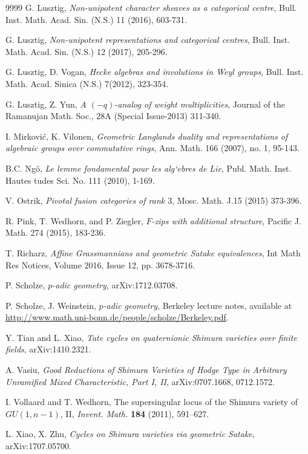\documentclass[11pt]{amsart}
\theoremstyle{definition}
\theoremstyle{definition}
\theoremstyle{definition}
\numberwithin{equation}{subsection}
\begin{document}
\begin{thebibliography}{9999}
G. Lusztig, {\it Non-unipotent character sheaves as a categorical centre}, Bull. Inst. Math. Acad. Sin. (N.S.) 11 (2016), 603-731.

G. Lusztig, {\it Non-unipotent representations and categorical centres}, Bull. Inst. Math. Acad. Sin. (N.S.) 12 (2017), 205-296.

G. Lusztig, D. Vogan, {\it Hecke algebras and involutions in Weyl groups}, Bull. Inst. Math. Acad. Sinica (N.S.) 7(2012), 323-354.

G. Lusztig, Z. Yun, {\it A $(-q)$-analog of weight multiplicities}, Journal of the Ramanujan Math. Soc., 28A (Special Issue-2013) 311-340.

I. Mirkovi\'c, K. Vilonen, 
{\it Geometric Langlands duality and representations of algebraic groups over commutative rings}, 
Ann. Math. 166 (2007), no. 1, 95-143.

B.C. Ng\^o, {\it Le lemme fondamental pour les alg`ebres
de Lie}, Publ. Math. Inst. Hautes tudes Sci. No. 111 (2010), 1-169.

V. Ostrik, {\it Pivotal fusion categories of rank $3$}, Mosc. Math. J.15 (2015) 373-396.

R. Pink, T. Wedhorn, and P. Ziegler, {\it $F$-zips with additional structure}, Pacific J. Math. 274 (2015), 183-236.

T. Richarz, {\it Affine Grassmannians and geometric Satake equivalences}, Int Math Res Notices, Volume 2016, Issue 12, pp. 3678-3716.

P. Scholze, {\it $p$-adic geometry}, arXiv:1712.03708.

P. Scholze, J. Weinstein, {\it $p$-adic geometry}, Berkeley lecture notes,
available at \url{http://www.math.uni-bonn.de/people/scholze/Berkeley.pdf}.

Y. Tian and L. Xiao, {\it Tate cycles on quaternionic Shimura varieties over finite fields}, arXiv:1410.2321.

A. Vasiu, {\it Good Reductions of Shimura Varieties of Hodge Type in Arbitrary Unramified Mixed Characteristic, Part I, II}, arXiv:0707.1668, 0712.1572.

I. Vollaard and T. Wedhorn,
The supersingular locus of the Shimura variety of $GU(1,n-1)$, II, {\it
Invent. Math.} {\bf 184} (2011), 591--627.

L. Xiao, X. Zhu, {\it Cycles on Shimura varieties via geometric Satake}, arXiv:1707.05700.


\end{thebibliography}
\end{document}
